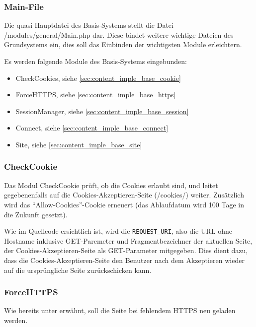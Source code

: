 \subsubsection{Main-File}
Die quasi Hauptdatei des Basis-Systems stellt die Datei /modules/general/Main.php dar. Diese bindet weitere wichtige Dateien des Grundsystems ein, dies soll das Einbinden der wichtigsten Module erleichtern.

Es werden folgende Module des Basis-Systems eingebunden:
\begin{itemize}
	\item CheckCookies, siehe \autoref{sec:content_imple_base_cookie}
	\item ForceHTTPS, siehe \autoref{sec:content_imple_base_https}
	\item SessionManager, siehe \autoref{sec:content_imple_base_session}
	\item Connect, siehe \autoref{sec:content_imple_base_connect}
	\item Site, siehe \autoref{sec:content_imple_base_site}
\end{itemize}

\subsubsection{CheckCookie}
\label{sec:content_imple_base_cookie}
Das Modul CheckCookie prüft, ob die Cookies erlaubt sind, und leitet gegebenenfalls auf die Cookies-Akzeptieren-Seite (/cookies/) weiter. Zusätzlich wird das \enquote{Allow-Cookies}-Cookie erneuert (das Ablaufdatum wird 100 Tage in die Zukunft gesetzt).

Wie im Quellcode ersichtlich ist, wird die \texttt{REQUEST\_URI}, also die URL ohne Hostname inklusive GET-Paremeter und Fragmentbezeichner der aktuellen Seite, der Cookies-Akzeptieren-Seite als GET-Parameter mitgegeben. Dies dient dazu, dass die Cookies-Akzeptieren-Seite den Benutzer nach dem Akzeptieren wieder auf die ursprüngliche Seite zurückschicken kann.

\subsubsection{ForceHTTPS}
\label{sec:content_imple_base_https}
Wie bereits unter  erwähnt, soll die Seite bei fehlendem HTTPS neu geladen werden.


